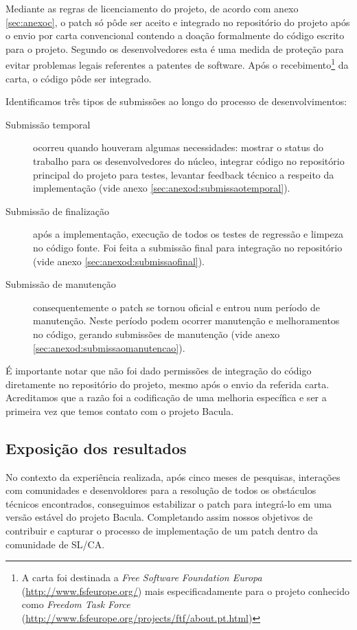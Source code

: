 Mediante as regras de licenciamento do projeto, de acordo com anexo \ref{sec:anexoc}, o patch só pôde ser aceito e integrado no repositório do projeto após o envio por carta convencional contendo a doação formalmente do código escrito para o projeto. Segundo os desenvolvedores esta é uma medida de proteção para evitar problemas legais referentes a patentes de software. 
Após o recebimento\footnote{A carta foi destinada a \textit{Free Software Foundation Europa} (\url{http://www.fsfeurope.org/}) mais especificadamente para o projeto conhecido como \textit{Freedom Task Force} (\url{http://www.fsfeurope.org/projects/ftf/about.pt.html})} da carta, o código pôde ser integrado.

Identificamos três tipos de submissões ao longo do processo de desenvolvimentos:

\begin{description}
\item[Submissão temporal] ocorreu quando houveram algumas necessidades: mostrar o status do trabalho para os desenvolvedores do núcleo, integrar código no repositório principal do projeto para testes, levantar feedback técnico a respeito da implementação (vide anexo \ref{sec:anexod:submissaotemporal}).
\item[Submissão de finalização] após a implementação, execução de todos os testes de regressão e limpeza no código fonte. Foi feita a submissão final para integração no repositório (vide anexo \ref{sec:anexod:submissaofinal}).
\item[Submissão de manutenção] consequentemente o patch \patchshort se tornou oficial e entrou num período de manutenção. Neste período podem ocorrer manutenção e melhoramentos no código, gerando submissões de manutenção (vide anexo \ref{sec:anexod:submissaomanutencao}).
\end{description}

É importante notar que não foi dado permissões de integração do código diretamente no repositório do projeto, mesmo após o envio da referida carta. Acreditamos que a razão foi a codificação de uma melhoria específica e ser a primeira vez que temos contato com o projeto Bacula.

\subsection{Exposição dos resultados}

No contexto da experiência realizada, após cinco meses de pesquisas, interações com  comunidades e desenvoldores para a resolução de todos os obstáculos técnicos encontrados, conseguimos estabilizar o patch \patchshort para integrá-lo em uma versão estável do projeto Bacula. Completando assim nossos objetivos de contribuir e capturar o processo de implementação de um patch dentro da comunidade de SL/CA. 


